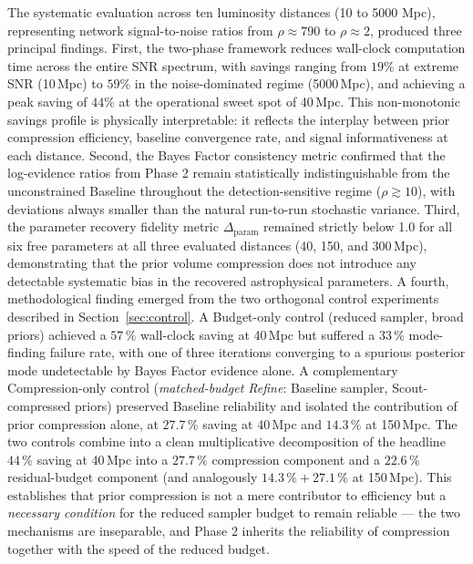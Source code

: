 \documentclass[12pt]{article}
\begin{document}
The systematic evaluation across ten luminosity distances (10 to 5000 Mpc), representing network signal-to-noise ratios from $\rho \approx 790$ to $\rho \approx 2$, produced three principal findings. First, the two-phase framework reduces wall-clock computation time across the entire SNR spectrum, with savings ranging from $19\%$ at extreme SNR (10\,Mpc) to $59\%$ in the noise-dominated regime (5000\,Mpc), and achieving a peak saving of $44\%$ at the operational sweet spot of 40\,Mpc. This non-monotonic savings profile is physically interpretable: it reflects the interplay between prior compression efficiency, baseline convergence rate, and signal informativeness at each distance. Second, the Bayes Factor consistency metric confirmed that the log-evidence ratios from Phase 2 remain statistically indistinguishable from the unconstrained Baseline throughout the detection-sensitive regime ($\rho \gtrsim 10$), with deviations always smaller than the natural run-to-run stochastic variance. Third, the parameter recovery fidelity metric $\Delta_{\text{param}}$ remained strictly below 1.0 for all six free parameters at all three evaluated distances (40, 150, and 300\,Mpc), demonstrating that the prior volume compression does not introduce any detectable systematic bias in the recovered astrophysical parameters. A fourth, methodological finding emerged from the two orthogonal control experiments described in Section~\ref{sec:control}. A Budget-only control (reduced sampler, broad priors) achieved a $57\,\%$ wall-clock saving at 40\,Mpc but suffered a $33\,\%$ mode-finding failure rate, with one of three iterations converging to a spurious posterior mode undetectable by Bayes Factor evidence alone. A complementary Compression-only control (\emph{matched-budget Refine}: Baseline sampler, Scout-compressed priors) preserved Baseline reliability and isolated the contribution of prior compression alone, at $27.7\,\%$ saving at 40\,Mpc and $14.3\,\%$ at 150\,Mpc. The two controls combine into a clean multiplicative decomposition of the headline $44\,\%$ saving at 40\,Mpc into a $27.7\,\%$ compression component and a $22.6\,\%$ residual-budget component (and analogously $14.3\,\% + 27.1\,\%$ at 150\,Mpc). This establishes that prior compression is not a mere contributor to efficiency but a \emph{necessary condition} for the reduced sampler budget to remain reliable --- the two mechanisms are inseparable, and Phase 2 inherits the reliability of compression together with the speed of the reduced budget.
\end{document}
